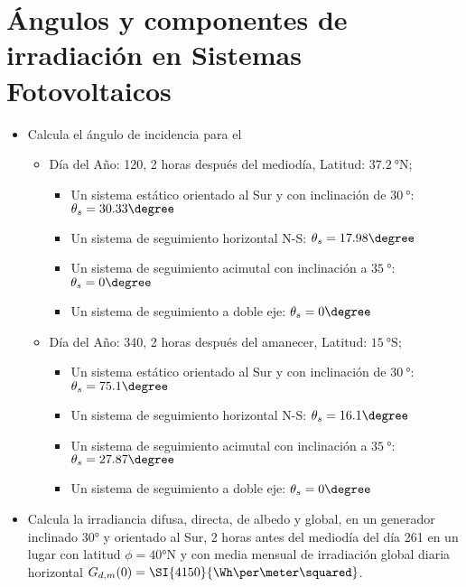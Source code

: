 \section{Ángulos y componentes de irradiación en Sistemas
  Fotovoltaicos}

\begin{itemize}
\item Calcula el ángulo de incidencia para el
  \begin{itemize}
  \item Día del Año: 120, 2 horas después del mediodía, Latitud:
    $\SI{37.2}{\degree}\mathrm{N}$;

    \begin{itemize}
    \item Un sistema estático orientado al Sur y con inclinación de
      $\SI{30}{\degree}$: $\theta_{s}=30.33\degree$
    \item Un sistema de seguimiento horizontal N-S:
      $\theta_{s}=17.98\degree$
    \item Un sistema de seguimiento acimutal con inclinación a
      $\SI{35}{\degree}$: $\theta_{s}=0\degree$
    \item Un sistema de seguimiento a doble eje: $\theta_{s}=0\degree$
    \end{itemize}
  \item Día del Año: 340, 2 horas después del amanecer, Latitud:
    $\SI{15}{\degree}\mathrm{S}$;

    \begin{itemize}
    \item Un sistema estático orientado al Sur y con inclinación de
      $\SI{30}{\degree}$: $\theta_{s}=75.1\degree$
    \item Un sistema de seguimiento horizontal N-S:
      $\theta_{s}=16.1\degree$
    \item Un sistema de seguimiento acimutal con inclinación a
      $\SI{35}{\degree}$: $\theta_{s}=27.87\degree$
    \item Un sistema de seguimiento a doble eje: $\theta_{s}=0\degree$
    \end{itemize}
  \end{itemize}


\item Calcula la irradiancia difusa, directa, de albedo y global, en
  un generador inclinado $\ang{30}$ y orientado al Sur, 2 horas antes
  del mediodía del día 261 en un lugar con latitud
  $\phi=\ang{40}\mathrm{N}$ y con media mensual de irradiación global
  diaria horizontal $G_{d,m}(0)=\SI{4150}{\Wh\per\meter\squared}$.


\end{itemize}
